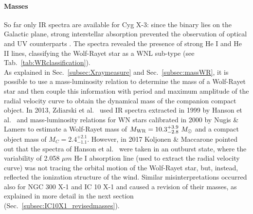 \documentclass[a4paper,titlepage]{book}     	%
\newcommand{\sun}{\ensuremath{_\odot}}
\newcommand{\msun}{\ensuremath{M\sun}}
\newcommand{\mwr}{\ensuremath{M_\textup{WR}}}
\begin{document}
\paragraph{Masses} So far only IR spectra are available for Cyg X-3: since the binary lies on the Galactic plane, strong interstellar absorption prevented the observation of optical and UV counterparts \cite{CygX-3_Koljonen2017}. The spectra revealed the presence of strong He I and He II lines, classifying the Wolf-Rayet star as a WNL sub-type (see Tab.\ \ref{tab:WRclassification}).\\

As explained in Sec.\ \ref{subsec:Xraymeasure} and Sec.\ \ref{subsec:massWR}, it is possible to use a mass-luminosity relation to determine the mass of a Wolf-Rayet star and then couple this information with period and maximum amplitude of the radial velocity curve to obtain the dynamical mass of the companion compact object. In 2013, Zdiarski et al.\ \cite{Cyg-X3_Zd2013} used IR spectra extracted in 1999 by Hanson et al.\ \cite{CygX-3_Hanson2000wrongspectrum} and mass-luminosity relations for WN stars calibrated in 2000 by Nugis \& Lamers \cite{Nugis2000_WRwinds} to estimate a Wolf-Rayet mass of $\mwr = 10.3_{-2.8}^{+3.9}~\msun$ and a compact object mass of $M_C = 2.4_{-1.1}^{+2.1}$. However, in 2017 Koljonen \& Maccarone \cite{CygX-3_Koljonen2017} pointed out that the spectra of Hanson et al.\ \cite{CygX-3_Hanson2000wrongspectrum} were taken in an outburst state, where the variability of 2.058 $\mu m$ He I absorption line (used to extract the radial velocity curve) was not tracing the orbital motion of the Wolf-Rayet star, but, instead, reflected the ionization structure of the wind. Similar misinterpretations occurred also for NGC 300 X-1 and IC 10 X-1 and caused a revision of their masses, as explained in more detail in the next section (Sec.\ \ref{subsec:IC10X1_revisedmasses}). \\
\end{document}
